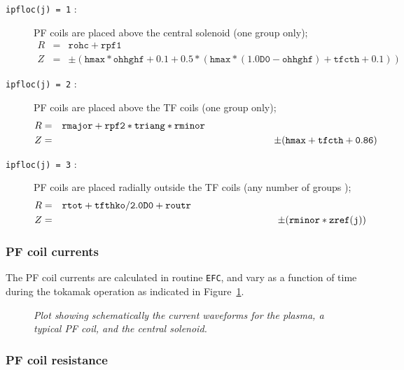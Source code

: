 \documentclass[11pt,a4paper]{report}
\begin{document}
\begin{description} %

\item [\texttt{ipfloc(j) = 1} :]  PF coils are placed above the central solenoid (one
group only);
\begin{eqnarray*}
R & = & \mathtt{rohc + rpf1} \\
Z & = & \pm
\mathtt{( hmax*ohhghf + 0.1 + 0.5*( hmax*(1.0D0-ohhghf)+tfcth+0.1) )}
\end{eqnarray*}

\item [\texttt{ipfloc(j) = 2} :]  PF coils are placed above the TF coils (one
group only);
\begin{eqnarray*}
R & = & \mathtt{rmajor + rpf2*triang*rminor} \hspace{62mm} \\
Z & = & \pm (\mathtt{hmax + tfcth + 0.86})
\end{eqnarray*}

\item [\texttt{ipfloc(j) = 3} :]  PF coils are placed radially outside the TF
coils (any number of groups );
\begin{eqnarray*}
R & = & \mathtt{rtot + tfthko/2.0D0 + routr} \hspace{63mm}\\
Z & = & \pm(\mathtt{rminor*zref(j)})
\end{eqnarray*}

\end{description}

\subsubsection{PF coil currents}

The PF coil currents are calculated in routine \texttt{EFC}, and vary as a
function of time during the tokamak operation as indicated in
Figure~\ref{fig:current_vs_time}.

\begin{figure}[tbph]
\caption[Coil and plasma current waveforms]
{\label{fig:current_vs_time}
  \textit{Plot showing schematically the current waveforms for the plasma, a
    typical PF coil, and the central solenoid.}
}
\end{figure}

\subsubsection{PF coil resistance}
\end{document}
